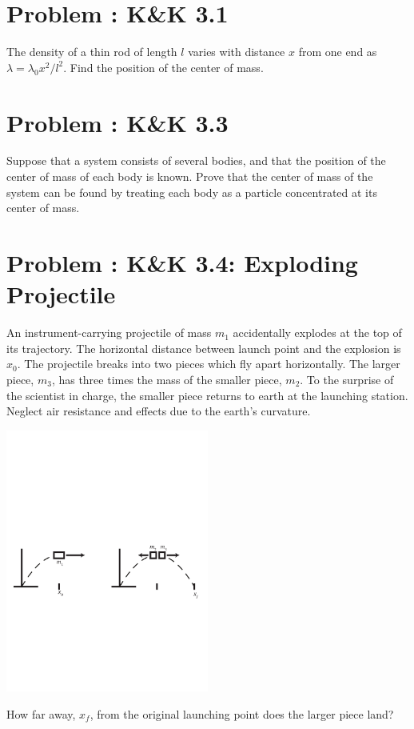 \documentclass[problems]{esg8012pset}
\date{October 1}
\begin{document}
\section{Problem \thesection: K\&K 3.1}
  The density of a thin rod of length $l$ varies with distance $x$ from one end as $\lambda = \lambda_0 x^2 / l^2$.  Find the position of the center of mass.
\section{Problem \thesection: K\&K 3.3}
  Suppose that a system consists of several bodies, and that the position of the center of mass of each body is known. Prove that the center of mass of the system can be found by treating each body as a particle concentrated at its center of mass.
\section{Problem \thesection: K\&K 3.4: Exploding Projectile}
  An instrument-carrying projectile of mass $m_1$ accidentally explodes at the top of its trajectory. The horizontal distance between launch point and the explosion is $x_0$.  The projectile breaks into two pieces which fly apart horizontally. The larger piece, $m_3$, has three times the mass of the smaller piece, $m_2$. To the surprise of the scientist in charge, the smaller piece returns to earth at the launching station. Neglect air resistance and effects due to the earth's curvature.
  \begin{center}\includegraphics[width=0.5\textwidth]{ps_04_1}\end{center}
  How far away, $x_f$, from the original launching point does the larger piece land?
\end{document}

